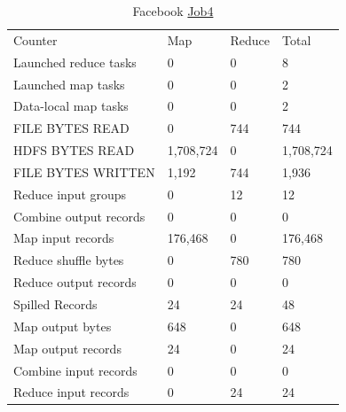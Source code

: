 \documentclass[paper=a4, fontsize=11pt]{scrartcl}	%
\numberwithin{equation}{section}															%
\numberwithin{figure}{section}																%
\numberwithin{table}{section}																%
\begin{document}
\begin{table}[!h]
	\centering
	\caption{Facebook \href{http://hadoop-compute0.di.univr.it:50030/jobdetails.jsp?jobid=job_201603141010_12304}{Job4}}
	\label{my-label}
	\begin{tabular}{llll}
		Counter&	Map&	Reduce&	Total\\
		Launched reduce tasks&	0&	0&	8\\
		Launched map tasks&	0&	0&	2\\
		Data-local map tasks&	0&	0&	2\\
		FILE BYTES READ&	0&	744&	744\\
		HDFS BYTES READ&	1,708,724&	0&	1,708,724\\
		FILE BYTES WRITTEN&	1,192&	744&	1,936\\
		Reduce input groups&	0&	12&	12\\
		Combine output records&	0&	0&	0\\
		Map input records&	176,468&	0&	176,468\\
		Reduce shuffle bytes&	0&	780&	780\\
		Reduce output records&	0&	0&	0\\
		Spilled Records&	24&	24&	48\\
		Map output bytes&	648&	0&	648\\
		Map output records&	24&	0&	24\\
		Combine input records&	0&	0&	0\\
		Reduce input records&	0&	24&	24\\
	\end{tabular}
\end{table}
\end{document}
